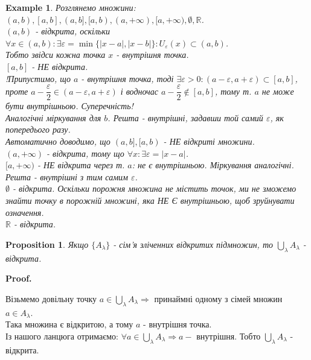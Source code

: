 \documentclass[a4paper, 14pt]{article}
\makeatletter
\def\qed{$\blacksquare$}
\theoremstyle{theoremdd}
\theoremstyle{theoremdd}
\theoremstyle{theoremdd}
\theoremstyle{theoremdd}
\newtheorem{example}[theorem]{Example}
\theoremstyle{theoremdd}
\newtheorem{proposition}[theorem]{Proposition}
\theoremstyle{theoremdd}
\theoremstyle{theoremdd}
\theoremstyle{theoremdd}
\renewenvironment{proof}[1][Proof.\\]{\par
\pushQED{\hfill \qed}%
\normalfont \topsep6\p@\@plus6\p@\relax
\trivlist
\item\relax
{\bfseries
#1\@addpunct{.}}\hspace\labelsep\ignorespaces
}{%
\popQED\endtrivlist\@endpefalse
}
\makeatother
\begin{document}
\begin{example}
Розглянемо множини: $(a,b), [a,b], (a,b], [a,b), (a,+\infty), [a,+\infty), \emptyset, \mathbb{R}$.\\
$(a,b)$ - відкрита, оскільки $\forall x \in (a,b): \exists \varepsilon = \min\{|x-a|,|x-b|\}:  U_{\varepsilon}(x) \subset (a,b)$.\\
Тобто звідси кожна точка $x$ - внутрішня точка.
\bigskip \\
$[a,b]$ - НЕ відкрита.\\
!Припустимо, що $a$ - внутрішня точка, тоді $\exists \varepsilon > 0: (a-\varepsilon, a+\varepsilon) \subset [a,b]$, проте $a-\dfrac{\varepsilon}{2} \in (a - \varepsilon, a + \varepsilon)$ і водночас $a-\dfrac{\varepsilon}{2} \not \in [a,b]$, тому т. $a$ не може бути внутрішньою. Суперечність! \\
Аналогічні міркування для $b$. Решта - внутрішні, задавши той самий $\varepsilon$, як попередього разу.
\bigskip \\
Автоматично доводимо, що $(a,b],[a,b)$ - НЕ відкриті множини.
\bigskip \\
$(a,+\infty)$ - відкрита, тому що $\forall x: \exists \varepsilon = |x-a|$.
\bigskip \\
$[a,+\infty)$ - НЕ відкрита через т. $a$: не є внутрішньою. Міркування аналогічні. Решта - внутрішні з тим самим $\varepsilon$.
\bigskip \\
$\emptyset$ - відкрита. Оскільки порожня множина не містить точок, ми не зможемо знайти точку в порожній множині, яка НЕ Є внутрішньою, щоб зруйнувати означення.
\bigskip \\
$\mathbb{R}$ - відкрита.
\bigskip \\
\end{example}

\begin{proposition}
Якщо $\{A_{\lambda}\}$ - сім'я зліченних відкритих підмножин, то $\displaystyle \bigcup_{\lambda} A_{\lambda}$ - відкрита.
\end{proposition}

\begin{proof}
Візьмемо довільну точку $a \in \displaystyle \bigcup_{\lambda} A_{\lambda} \Rightarrow$ принаймні одному з сімей множин $a \in A_{\lambda}$.\\
Така множина є відкритою, а тому $a$ - внутрішня точка.\\
Із нашого ланцюга отримаємо: $\forall a \in \displaystyle \bigcup_{\lambda} A_{\lambda} \Rightarrow a - $ внутрішня. Тобто $\displaystyle \bigcup_{\lambda} A_{\lambda}$ - відкрита.
\end{proof}
\end{document}
